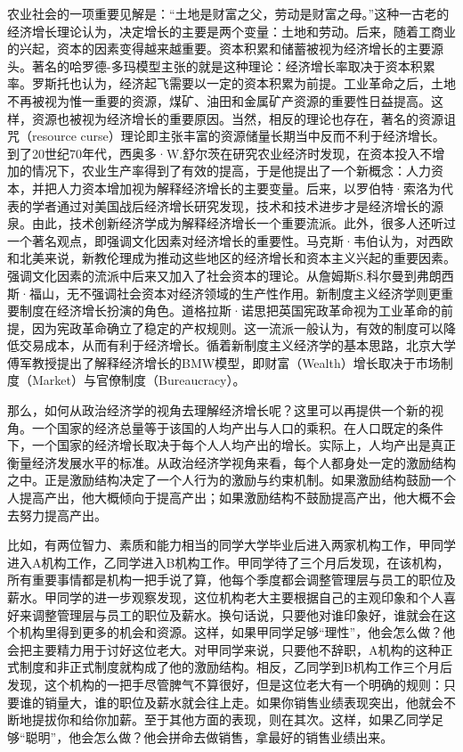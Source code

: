 农业社会的一项重要见解是：“土地是财富之父，劳动是财富之母。”这种一古老的经济增长理论认为，决定增长的主要是两个变量：土地和劳动。后来，随着工商业的兴起，资本的因素变得越来越重要。资本积累和储蓄被视为经济增长的主要源头。著名的哈罗德-多玛模型主张的就是这种理论：经济增长率取决于资本积累率。罗斯托也认为，经济起飞需要以一定的资本积累为前提。工业革命之后，土地不再被视为惟一重要的资源，煤矿、油田和金属矿产资源的重要性日益提高。这样，资源也被视为经济增长的重要原因。当然，相反的理论也存在，著名的资源诅咒（resource curse）理论即主张丰富的资源储量长期当中反而不利于经济增长。到了20世纪70年代，西奥多·W.舒尔茨在研究农业经济时发现，在资本投入不增加的情况下，农业生产率得到了有效的提高，于是他提出了一个新概念：人力资本，并把人力资本增加视为解释经济增长的主要变量。后来，以罗伯特·索洛为代表的学者通过对美国战后经济增长研究发现，技术和技术进步才是经济增长的源泉。由此，技术创新经济学成为解释经济增长一个重要流派。此外，很多人还听过一个著名观点，即强调文化因素对经济增长的重要性。马克斯·韦伯认为，对西欧和北美来说，新教伦理成为推动这些地区的经济增长和资本主义兴起的重要因素。强调文化因素的流派中后来又加入了社会资本的理论。从詹姆斯S.科尔曼到弗朗西斯·福山，无不强调社会资本对经济领域的生产性作用。新制度主义经济学则更重要制度在经济增长扮演的角色。道格拉斯·诺思把英国宪政革命视为工业革命的前提，因为宪政革命确立了稳定的产权规则。这一流派一般认为，有效的制度可以降低交易成本，从而有利于经济增长。循着新制度主义经济学的基本思路，北京大学傅军教授提出了解释经济增长的BMW模型，即财富（Wealth）增长取决于市场制度（Market）与官僚制度（Bureaucracy）。

那么，如何从政治经济学的视角去理解经济增长呢？这里可以再提供一个新的视角。一个国家的经济总量等于该国的人均产出与人口的乘积。在人口既定的条件下，一个国家的经济增长取决于每个人人均产出的增长。实际上，人均产出是真正衡量经济发展水平的标准。从政治经济学视角来看，每个人都身处一定的激励结构之中。正是激励结构决定了一个人行为的激励与约束机制。如果激励结构鼓励一个人提高产出，他大概倾向于提高产出；如果激励结构不鼓励提高产出，他大概不会去努力提高产出。

比如，有两位智力、素质和能力相当的同学大学毕业后进入两家机构工作，甲同学进入A机构工作，乙同学进入B机构工作。甲同学待了三个月后发现，在该机构，所有重要事情都是机构一把手说了算，他每个季度都会调整管理层与员工的职位及薪水。甲同学的进一步观察发现，这位机构老大主要根据自己的主观印象和个人喜好来调整管理层与员工的职位及薪水。换句话说，只要他对谁印象好，谁就会在这个机构里得到更多的机会和资源。这样，如果甲同学足够“理性”，他会怎么做？他会把主要精力用于讨好这位老大。对甲同学来说，只要他不辞职，A机构的这种正式制度和非正式制度就构成了他的激励结构。相反，乙同学到B机构工作三个月后发现，这个机构的一把手尽管脾气不算很好，但是这位老大有一个明确的规则：只要谁的销量大，谁的职位及薪水就会往上走。如果你销售业绩表现突出，他就会不断地提拔你和给你加薪。至于其他方面的表现，则在其次。这样，如果乙同学足够“聪明”，他会怎么做？他会拼命去做销售，拿最好的销售业绩出来。

